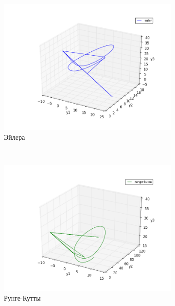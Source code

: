 \documentclass[oneside, final, 11pt]{article}
\begin{document}
\begin{figure}[h]
    \centering
    \begin{subfigure}[h]{0.45\textwidth}
        \includegraphics[width=\textwidth]{figure_2.png}
        \caption{Эйлера}
        \label{s1}
    \end{subfigure}
    ~
    \begin{subfigure}[h]{0.45\textwidth}
        \includegraphics[width=\textwidth]{figure_3.png}
        \caption{Рунге-Кутты}
        \label{s2}
    \end{subfigure}
     ~
    \begin{subfigure}[h]{1\textwidth}

\end{subfigure}
\end{figure}
\end{document}
